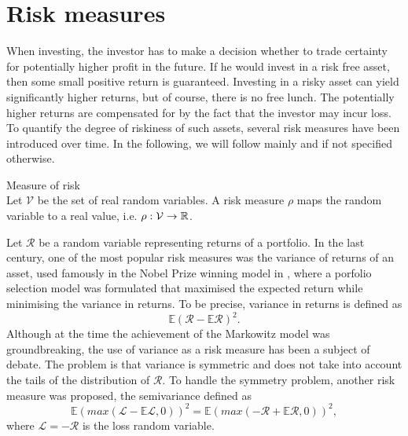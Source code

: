 \chapter{Risk measures}
When investing, the investor has to make a decision whether to trade certainty for potentially higher profit in the future. If he would invest in a risk free asset, then some small positive return is guaranteed. Investing in a risky asset can yield significantly higher returns, but of course, there is no free lunch. The potentially higher returns are compensated for by the fact that the investor may incur loss. To quantify the degree of riskiness of such assets, several risk measures have been introduced over time.
In the following, we will follow mainly \cite{leoppold_risk_measures} and \cite[p. 275-278]{cornuejols_tutuncu_2006} if not specified otherwise.

\begin{defn}{Measure of risk} \\
Let $\mathcal{V}$ be the set of real random variables. A risk measure $\rho$ maps the random variable to a real value, i.e. $\rho: \mathcal{V} \rightarrow \mathbb{R}$.
\end{defn}

Let $\mathcal{R}$ be a random variable representing returns of a portfolio. In the last century, one of the most popular risk measures was the variance of returns of an asset, used famously in the Nobel Prize winning model in \cite{markowitz}, where a porfolio selection model was formulated that maximised the expected return while minimising the variance in returns. To be precise, variance in returns is defined as
\begin{equation*}
\mathbb{E}(\mathcal{R} - \mathbb{E}\mathcal{R} )^2.
\end{equation*}
Although at the time the achievement of the Markowitz model was groundbreaking, the use of variance as a risk measure has been a subject of debate. The problem is that variance is symmetric and does not take into account the tails of the distribution of $\mathcal{R}$. To handle the symmetry problem, another risk measure was proposed, the semivariance defined as
\begin{equation*}
\mathbb{E}(max(\mathcal{L} - \mathbb{E}\mathcal{L},0))^2=\mathbb{E}(max(-\mathcal{R} + \mathbb{E}\mathcal{R},0))^2,
\end{equation*}
where $\mathcal{L}=-\mathcal{R}$ is the loss random variable.

